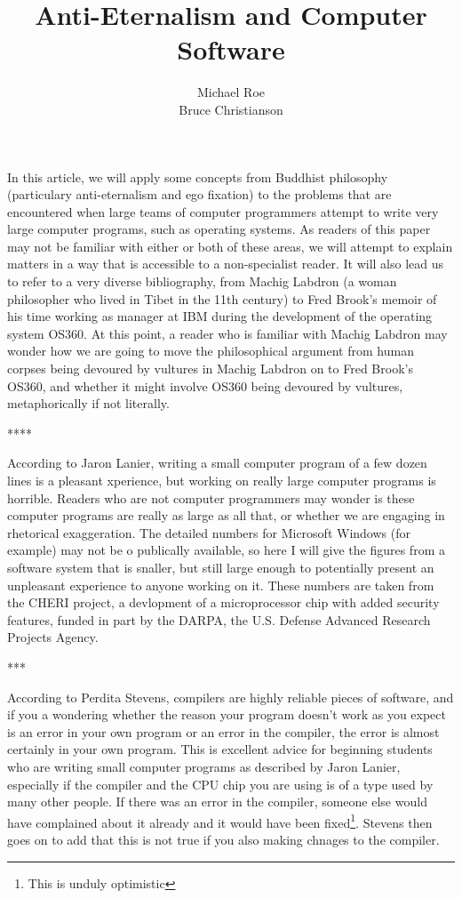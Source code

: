 \documentclass{article}
\title{Anti-Eternalism and Computer Software}
\author{
Michael Roe \\
Bruce Christianson \\
}
\begin{document}
\maketitle

In this article, we will apply some concepts from Buddhist philosophy
(particulary anti-eternalism and ego fixation) to the problems
that are encountered when large teams of computer programmers
attempt to write very large computer programs, such as operating
systems. As readers of this paper may not be familiar with either
or both of these areas, we will attempt to explain matters in a way
that is accessible to a non-specialist reader. It will also lead
us to refer to a very diverse bibliography, from Machig Labdron (a
woman philosopher who lived in Tibet in the 11th century) to
Fred Brook's memoir of his time working as manager at IBM during
the development of the operating system OS360. At this point,
a reader who is familiar with Machig Labdron may wonder how we
are going to move the philosophical argument from human corpses
being devoured by vultures in Machig Labdron on to Fred Brook's
OS360,
and whether it might involve OS360 being devoured by vultures,
metaphorically if not literally.


****

According to Jaron Lanier, writing a small computer program of
a few dozen lines is a pleasant xperience, but working on really large
computer programs is horrible. Readers who are not computer programmers
may wonder is these computer programs are really as large as all
that, or whether we are engaging in rhetorical exaggeration.
The detailed numbers for Microsoft Windows (for example) may not be o
publically available, so here I will give the figures from a software
system that is snaller, but still large enough to potentially present
an unpleasant experience to anyone working on it. These numbers
are taken from the CHERI project, a devlopment of a microprocessor
chip with added security features, funded in part by the DARPA, 
the U.S. Defense Advanced Research Projects Agency.

***


According to Perdita Stevens, compilers are highly reliable pieces
of software, and if you a wondering whether the reason your program
doesn't work as you expect is an error in your own program or an
error in the compiler, the error is almost certainly in your own
program. This is excellent advice for beginning students who are
writing small computer programs as described by Jaron Lanier,
especially if the compiler and the CPU chip you are using is
of a type used by many other people. If there was an error in the
compiler, someone else would have complained about it already
and it would have been fixed\footnote{This is unduly optimistic}.
Stevens then goes on to add that this is not true if you also
making chnages to the compiler.
\end{document}
